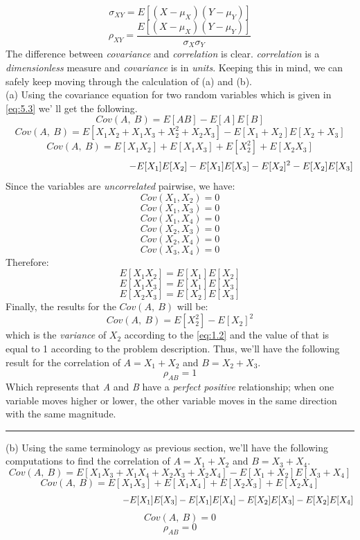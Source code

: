 \documentclass[12pt]{article}
\numberwithin{equation}{section}
\numberwithin{table}{section}
\numberwithin{figure}{section}
\begin{document}
\begin{equation}\label{eq:5.1}
	\sigma_{XY} = E[(X-\mu_X)(Y-\mu_Y)]
\end{equation}
\begin{equation}\label{eq:5.2}
	\rho_{XY} = \frac{E[(X-\mu_X)(Y-\mu_Y)]}{\sigma_X\sigma_Y}
\end{equation}
The difference between \textit{covariance} and \textit{correlation} is clear. \textit{correlation} is a \textit{dimensionless} measure and \textit{covariance} is in \textit{units}. Keeping this in mind, we can safely keep moving through the calculation of (a) and (b).\\
(a) Using the covariance equation for two random variables which is given in \ref{eq:5.3} we'
ll get the following.
\newpage
\begin{equation}\label{eq:5.3}
Cov(A,\ B) = E[AB] - E[A]E[B]
\end{equation}
$$
	Cov(A,\ B) = E[X_1X_2 + X_1X_3 + X_2^2 + X_2X_3] - E[X_1 + X_2]E[X_2 + X_3]
$$
$$
Cov(A,\ B) = E[X_1X_2] + E[X_1X_3] + E[X_2^2] + E[X_2X_3]
$$
$$
\hspace{4.5cm}- E[X_1]E[X_2] - E[X_1]E[X_3] - E[X_2]^2 - E[X_2]E[X_3]
$$
Since the variables are \textit{uncorrelated} pairwise, we have:
$$
	Cov(X_1, X_2) = 0
$$
$$
Cov(X_1, X_3) = 0
$$
$$
Cov(X_1, X_4) = 0
$$
$$
Cov(X_2, X_3) = 0
$$
$$
Cov(X_2, X_4) = 0
$$
$$
Cov(X_3, X_4) = 0
$$
Therefore:
$$
E[X_1X_2] = E[X_1]E[X_2]
$$
$$
E[X_1X_3] = E[X_1]E[X_3]
$$
$$
E[X_2X_3] = E[X_2]E[X_3]
$$
Finally, the results for the $Cov(A,\ B)$ will be:
$$
	Cov(A,\ B) = E[X_2^2] - E[X_2]^2
$$
which is the \textit{variance} of $X_2$ according to the \ref{eq:1.2} and the value of that is equal to 1 according to the problem description. Thus, we'll have the following result for the correlation of $A=X_1+X_2$ and $B=X_2+X_3$.
$$
\boxed{\rho_{AB} =	1}
$$
Which represents that \textit{A} and \textit{B} have a \textit{perfect positive} relationship; when one variable moves higher or lower, the other variable moves in the same direction with the same magnitude.

\noindent\rule{\textwidth}{.5pt}
(b) Using the same terminology as previous section, we'll have the following computations to find the correlation of $A = X_1 + X_2$ and $B = X_3 + X_4$.
$$
Cov(A,\ B) = E[X_1X_3 + X_1X_4 + X_2X_3 + X_2X_4] - E[X_1 + X_2]E[X_3 + X_4]
$$
$$
Cov(A,\ B) = E[X_1X_3] + E[X_1X_4] + E[X_2X_3] + E[X_2X_4]
$$
$$
\hspace{4.5cm}- E[X_1]E[X_3] - E[X_1]E[X_4] - E[X_2]E[X_3] - E[X_2]E[X_4]
$$
$$
	Cov(A,\ B) = 0
$$
$$
\boxed{\rho_{AB} =	0}
$$
\newpage
\end{document}
